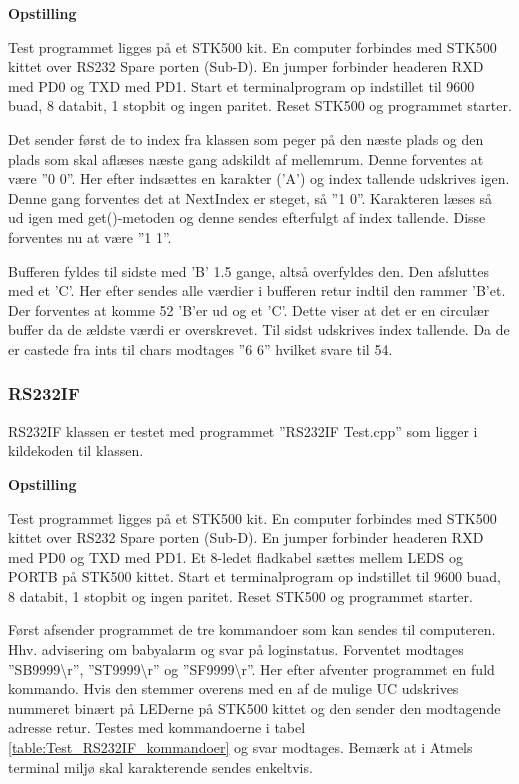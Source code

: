 \textbf{Opstilling}

Test programmet ligges på et STK500 kit.
En computer forbindes med STK500 kittet over RS232 Spare porten (Sub-D).
En jumper forbinder headeren RXD med PD0 og TXD med PD1.
Start et terminalprogram op indstillet til 9600 buad, 8 databit, 1 stopbit og ingen paritet.
Reset STK500 og programmet starter.

Det sender først de to index fra klassen som peger på den næste plads og den plads som skal aflæses næste gang adskildt af mellemrum.
Denne forventes at være ''0 0''. Her efter indsættes en karakter ('A') og index tallende udskrives igen. Denne gang forventes det at NextIndex er steget, så ''1 0''. Karakteren læses så ud igen med get()-metoden og denne sendes efterfulgt af index tallende. Disse forventes nu at være ''1 1''.

Bufferen fyldes til sidste med 'B' 1.5 gange, altså overfyldes den. Den afsluttes med et 'C'. Her efter sendes alle værdier i bufferen retur indtil den rammer 'B'et. Der forventes at komme 52 'B'er ud og et 'C'. Dette viser at det er en circulær buffer da de ældste værdi er overskrevet.
Til sidst udskrives index tallende. Da de er castede fra ints til chars modtages ''6 6'' hvilket svare til 54.

\subsubsection{RS232IF}
RS232IF klassen er testet med programmet ''RS232IF Test.cpp'' som ligger i kildekoden til klassen.

\textbf{Opstilling}

Test programmet ligges på et STK500 kit.
En computer forbindes med STK500 kittet over RS232 Spare porten (Sub-D).
En jumper forbinder headeren RXD med PD0 og TXD med PD1. Et 8-ledet fladkabel sættes mellem LEDS og PORTB på STK500 kittet.
Start et terminalprogram op indstillet til 9600 buad, 8 databit, 1 stopbit og ingen paritet.
Reset STK500 og programmet starter.

Først afsender programmet de tre kommandoer som kan sendes til computeren. Hhv. advisering om babyalarm og svar på loginstatus.
Forventet modtages ''SB9999\textbackslash r'', ''ST9999\textbackslash r'' og ''SF9999\textbackslash r''.
Her efter afventer programmet en fuld kommando. Hvis den stemmer overens med en af de mulige UC udskrives nummeret binært på LEDerne på STK500 kittet og den sender den modtagende adresse retur.
Testes med kommandoerne i tabel \ref{table:Test_RS232IF_kommandoer} og svar modtages. Bemærk at i Atmels terminal miljø skal karakterende sendes enkeltvis.

